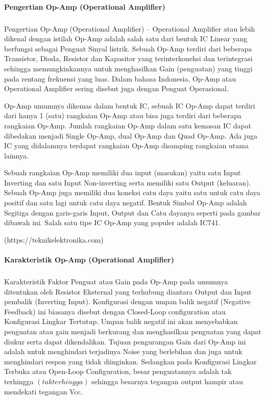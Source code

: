 \documentclass[12pt,a4paper]{article}
\begin{document}
\paragraph{ }
\textbf{Pengertian Op-Amp (Operational Amplifier)}
\subparagraph{ }
	Pengertian Op-Amp (Operational Amplifier) – Operational Amplifier atau lebih dikenal dengan istilah Op-Amp adalah salah satu dari bentuk IC Linear yang berfungsi sebagai Penguat Sinyal listrik. Sebuah Op-Amp terdiri dari beberapa Transistor, Dioda, Resistor dan Kapasitor yang terinterkoneksi dan terintegrasi sehingga memungkinkannya untuk menghasilkan Gain (penguatan) yang tinggi pada rentang frekuensi yang luas. Dalam bahasa Indonesia, Op-Amp atau Operational Amplifier sering disebut juga dengan Penguat Operasional.


 
Op-Amp umumnya dikemas dalam bentuk IC, sebuah IC Op-Amp dapat terdiri dari hanya 1 (satu) rangkaian Op-Amp atau bisa juga terdiri dari beberapa rangkaian Op-Amp. Jumlah rangkaian Op-Amp dalam satu kemasan IC dapat dibedakan menjadi Single Op-Amp, dual Op-Amp dan Quad Op-Amp. Ada juga IC yang didalamnya terdapat rangkaian Op-Amp disamping rangkaian utama lainnya.

Sebuah rangkaian Op-Amp memiliki dua input (masukan) yaitu satu Input Inverting dan satu Input Non-inverting serta memiliki satu Output (keluaran). Sebuah Op-Amp juga memiliki dua koneksi catu daya yaitu satu untuk catu daya positif dan satu lagi untuk catu daya negatif. Bentuk Simbol Op-Amp adalah Segitiga dengan garis-garis Input, Output dan Catu dayanya seperti pada gambar dibawah ini. Salah satu tipe IC Op-Amp yang populer adalah IC741.

\begin{flushright}
(https://teknikelektronika.com) 
\end{flushright}

\paragraph{ }
\textbf{Karakteristik Op-Amp (Operational Amplifier)}
\subparagraph{ }
Karakteristik Faktor Penguat atau Gain pada Op-Amp pada umumnya ditentukan oleh Resistor Eksternal yang terhubung diantara Output dan Input pembalik (Inverting Input). Konfigurasi dengan umpan balik negatif (Negative Feedback) ini biasanya disebut dengan Closed-Loop configuration atau Konfigurasi Lingkar Tertutup. Umpan balik negatif ini akan menyebabkan penguatan atau gain menjadi berkurang dan menghasilkan penguatan yang dapat diukur serta dapat dikendalikan. Tujuan pengurangan Gain dari Op-Amp ini adalah untuk menghindari terjadinya Noise yang berlebihan dan juga untuk menghindari respon yang tidak diinginkan. Sedangkan pada Konfigurasi Lingkar Terbuka atau Open-Loop Configuration, besar penguatannya adalah tak terhingga $(tak terhingga)$ sehingga besarnya tegangan output hampir atau mendekati tegangan Vcc.
\end{document}
